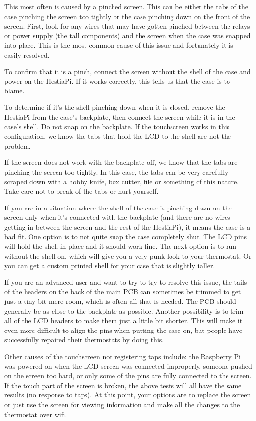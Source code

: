 This most often is caused by a pinched screen. This can be either the tabs of
the case pinching the screen too tightly or the case pinching down on the front
of the screen. First, look for any wires that may have gotten pinched between
the relays or power supply (the tall components) and the screen when the case
was snapped into place. This is the most common cause of this issue and
fortunately it is easily resolved.

To confirm that it is a pinch, connect the screen without the shell of the case
and power on the HestiaPi. If it works correctly, this tells us that the case
is to blame.

To determine if it's the shell pinching down when it is closed, remove the
HestiaPi from the case's backplate, then connect the screen while it is in the
case's shell. Do not snap on the backplate. If the touchscreen works in this
configuration, we know the tabs that hold the LCD to the shell are not the
problem.

If the screen does not work with the backplate off, we know that the tabs are
pinching the screen too tightly. In this case, the tabs can be very carefully
scraped down with a hobby knife, box cutter, file or something of this nature.
Take care not to break of the tabs or hurt yourself.

If you are in a situation where the shell of the case is pinching down on the
screen only when it's connected with the backplate (and there are no wires
getting in between the screen and the rest of the HestiaPi), it means the case
is a bad fit. One option is to not quite snap the case completely shut. The LCD
pins will hold the shell in place and it should work fine. The next option is
to run without the shell on, which will give you a very punk look to your
thermostat. Or you can get a custom printed shell for your case that is slightly
taller.

If you are an advanced user and want to try to try to resolve this issue, the
tails of the headers on the back of the main PCB can sometimes be trimmed to
get just a tiny bit more room, which is often all that is needed. The PCB
should generally be as close to the backplate as possible. Another possibility
is to trim all of the LCD headers to make them just a little bit shorter. This
will make it even more difficult to align the pins when putting the case on,
but people have successfully repaired their thermostats by doing this.

Other causes of the touchscreen not registering taps include: the Raspberry Pi
was powered on when the LCD screen was connected improperly, someone pushed on
the screen too hard, or only some of the pins are fully connected to the
screen. If the touch part of the screen is broken, the above tests will all
have the same results (no response to taps). At this point, your options are to
replace the screen or just use the screen for viewing information and make all
the changes to the thermostat over wifi.

